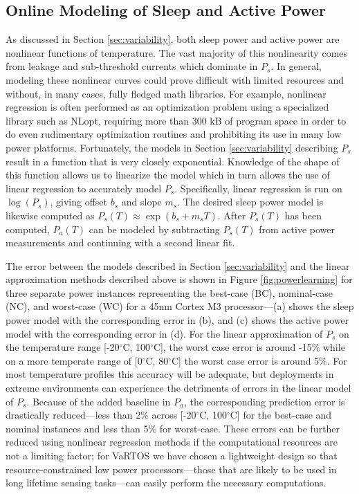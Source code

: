 \subsection{Online Modeling of Sleep and Active Power}
As discussed in Section \ref{sec:variability}, both sleep power and active power are nonlinear functions of temperature.  The vast majority of this nonlinearity comes from leakage and sub-threshold currents which dominate in $P_s$. In general, modeling these nonlinear curves could prove difficult with limited resources and without, in many cases, fully fledged math libraries. For example, nonlinear regression is often performed as an optimization problem using a specialized library such as NLopt, requiring more than 300 kB of program space in order to do even rudimentary optimization routines \cite{nlopt} and prohibiting its use in many low power platforms.   Fortunately, the models in Section \ref{sec:variability} describing $P_s$ result in a function that is very closely exponential.  Knowledge of the shape of this function allows us to linearize the model which in turn allows the use of linear regression to accurately model $P_s$.  Specifically, linear regression is run on $\log(P_s)$, giving offset $b_s$ and slope $m_s$.  The desired sleep power model is likewise computed as $P_s(T) \approx \exp(b_s + m_sT)$. After $P_s(T)$ has been computed, $P_a(T)$ can be modeled by subtracting $P_s(T)$ from active power measurements and continuing with a second linear fit.  

The error between the models described in Section \ref{sec:variability} and the linear approximation methods described above is shown in Figure \ref{fig:powerlearning} for three separate power instances representing the best-case (BC), nominal-case (NC), and worst-case (WC) for a 45nm Cortex M3 processor---(a) shows the sleep power model with the corresponding error in (b), and (c) shows the active power model with the corresponding error in (d).  For the linear approximation of $P_s$ on the temperature range [-20$^\circ$C, 100$^\circ$C], the worst case error is around -15\% while on a more temperate range of [0$^\circ$C, 80$^\circ$C] the worst case error is around 5\%.  For most temperature profiles this accuracy will be adequate, but deployments in extreme environments can experience the detriments of errors in the linear model of $P_s$.  Because of the added baseline in $P_a$, the corresponding prediction error is drastically reduced---less than 2\% across [-20$^\circ$C, 100$^\circ$C] for the best-case and nominal instances and less than 5\% for worst-case.  These errors can be further reduced using nonlinear regression methods if the computational resources are not a limiting factor; for VaRTOS we have chosen a lightweight design so that resource-constrained low power processors---those that are likely to be used in long lifetime sensing tasks---can easily perform the necessary computations. 

